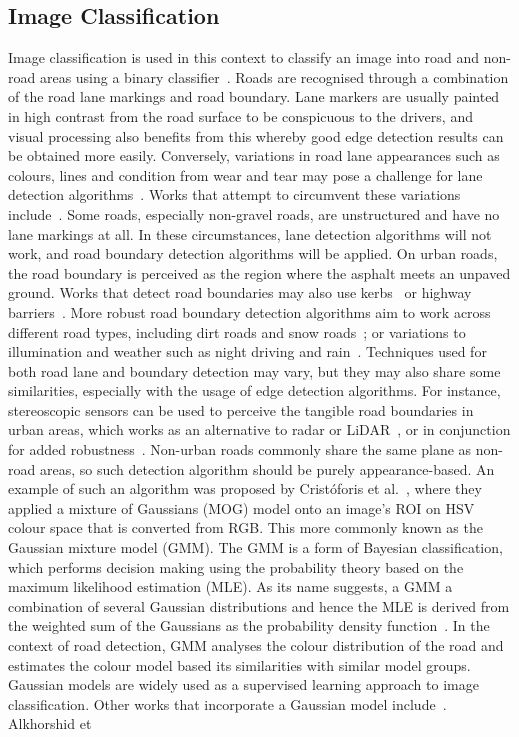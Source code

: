 \subsection{Image Classification} \label{secimage}
Image classification is used in this context to classify an image into road and non-road areas using a binary classifier~\cite{cristoforis_real-time_2016}. Roads are recognised through a combination of the road lane markings and road boundary. Lane markers are usually painted in high contrast from the road surface to be conspicuous to the drivers, and visual processing also benefits from this whereby good edge detection results can be obtained more easily. Conversely, variations in road lane appearances such as colours, lines and condition from wear and tear may pose a challenge for lane detection algorithms~\cite{j._c._mccall_video-based_2006}. Works that attempt to circumvent these variations include~\cite{fernando_real-time_2014,j._huang_robust_2013}. Some roads, especially non-gravel roads, are unstructured and have no lane markings at all. In these circumstances, lane detection algorithms will not work, and road boundary detection algorithms will be applied. On urban roads, the road boundary is perceived as the region where the asphalt meets an unpaved ground. Works that detect road boundaries may also use kerbs~\cite{f._oniga_curb_2011} or highway barriers~\cite{t._scharwachter_visual_2014}. More robust road boundary detection algorithms aim to work across different road types, including dirt roads and snow roads~\cite{h._kong_general_2010}; or variations to illumination and weather such as night driving and rain~\cite{j._dai_night-time_2014,shibata_detection_2014}. Techniques used for both road lane and boundary detection may vary, but they may also share some similarities, especially with the usage of edge detection algorithms. For instance, stereoscopic sensors can be used to perceive the tangible road boundaries in urban areas, which works as an alternative to radar or LiDAR~\cite{hu_roadside_2011}, or in conjunction for added robustness~\cite{c._fernandez_curvature-based_2015}. Non-urban roads commonly share the same plane as non-road areas, so such detection algorithm should be purely appearance-based. An example of such an algorithm was proposed by Crist\'{o}foris et al.~\cite{cristoforis_real-time_2016}, where they applied a mixture of Gaussians (MOG) model onto an image's ROI on HSV colour space that is converted from RGB. This more commonly known as the Gaussian mixture model (GMM). The GMM is a form of Bayesian classification, which performs decision making using the probability theory based on the maximum likelihood estimation (MLE). As its name suggests, a GMM a combination of several Gaussian distributions and hence the MLE is derived from the weighted sum of the Gaussians as the probability density function~\cite{paalanen_feature_2006}. In the context of road detection, GMM analyses the colour distribution of the road and estimates the colour model based its similarities with similar model groups. Gaussian models are widely used as a supervised learning approach to image classification.   Other works that incorporate a Gaussian model include~\cite{m._aly_real_2008,wang_adaptive_2015}. Alkhorshid et 